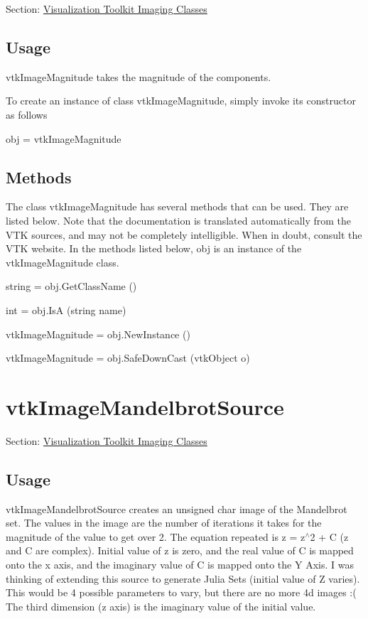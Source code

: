 Section\-: \hyperlink{sec_vtkimaging}{Visualization Toolkit Imaging Classes} \hypertarget{vtkwidgets_vtkxyplotwidget_Usage}{}\subsection{Usage}\label{vtkwidgets_vtkxyplotwidget_Usage}
vtk\-Image\-Magnitude takes the magnitude of the components.

To create an instance of class vtk\-Image\-Magnitude, simply invoke its constructor as follows \begin{DoxyVerb}  obj = vtkImageMagnitude
\end{DoxyVerb}
 \hypertarget{vtkwidgets_vtkxyplotwidget_Methods}{}\subsection{Methods}\label{vtkwidgets_vtkxyplotwidget_Methods}
The class vtk\-Image\-Magnitude has several methods that can be used. They are listed below. Note that the documentation is translated automatically from the V\-T\-K sources, and may not be completely intelligible. When in doubt, consult the V\-T\-K website. In the methods listed below, {\ttfamily obj} is an instance of the vtk\-Image\-Magnitude class. 
\begin{DoxyItemize}
\item {\ttfamily string = obj.\-Get\-Class\-Name ()}  
\item {\ttfamily int = obj.\-Is\-A (string name)}  
\item {\ttfamily vtk\-Image\-Magnitude = obj.\-New\-Instance ()}  
\item {\ttfamily vtk\-Image\-Magnitude = obj.\-Safe\-Down\-Cast (vtk\-Object o)}  
\end{DoxyItemize}\hypertarget{vtkimaging_vtkimagemandelbrotsource}{}\section{vtk\-Image\-Mandelbrot\-Source}\label{vtkimaging_vtkimagemandelbrotsource}
Section\-: \hyperlink{sec_vtkimaging}{Visualization Toolkit Imaging Classes} \hypertarget{vtkwidgets_vtkxyplotwidget_Usage}{}\subsection{Usage}\label{vtkwidgets_vtkxyplotwidget_Usage}
vtk\-Image\-Mandelbrot\-Source creates an unsigned char image of the Mandelbrot set. The values in the image are the number of iterations it takes for the magnitude of the value to get over 2. The equation repeated is z = z$^\wedge$2 + C (z and C are complex). Initial value of z is zero, and the real value of C is mapped onto the x axis, and the imaginary value of C is mapped onto the Y Axis. I was thinking of extending this source to generate Julia Sets (initial value of Z varies). This would be 4 possible parameters to vary, but there are no more 4d images \-:( The third dimension (z axis) is the imaginary value of the initial value.

